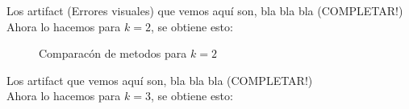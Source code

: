 Los artifact (Errores visuales) que vemos aquí son, bla bla bla (COMPLETAR!)
\\
Ahora lo hacemos para $k=2$, se obtiene esto:


\begin{figure}[H]
    \centering
    \qquad
    \qquad
    \caption{Comparacón de metodos para $k = 2$}%
    \label{fig:example}%
\end{figure}

Los artifact que vemos aquí son, bla bla bla (COMPLETAR!)
\\
Ahora lo hacemos para $k=3$, se obtiene esto:

